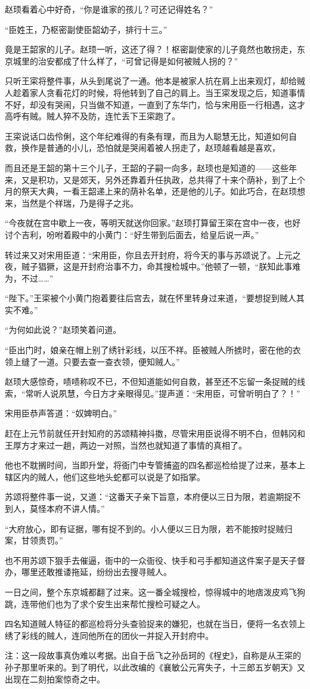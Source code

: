 赵顼看着心中好奇，“你是谁家的孩儿？可还记得姓名？”

“臣姓王，乃枢密副使臣韶幼子，排行十三。”

竟是王韶家的儿子。赵顼一听，这还了得？！枢密副使家的儿子竟然也敢拐走，东京城里的治安都成了什么样了，“可曾记得是如何被贼人拐的？”

只听王寀将整件事，从头到尾说了一通。他本是被家人抗在肩上出来观灯，却给贼人趁着家人贪看花灯的时候，将他转到了自己的肩上。当王寀发现之后，知道事情不好，却没有哭闹，只当做不知道，一直到了东华门，恰与宋用臣一行相遇，这才高呼有贼。贼人猝不及防，连忙丢下王寀跑了。

王寀说话口齿伶俐，这个年纪难得的有条有理，而且为人聪慧无比，知道如何自救，换作是普通的小儿，恐怕就是哭闹着被人拐走了，赵顼越看越是喜欢，

而且还是王韶的第十三个儿子，王韶的子嗣一向多，赵顼也是知道的——这些年来，又是积功，又是郊天，另外还靠着升任执政，总共得了十来个荫补，到了上个月的祭天大典，一看王韶递上来的荫补名单，还是他的儿子。如此巧合，在赵顼想来，当然是个祥瑞，乃是得子之兆。

“今夜就在宫中歇上一夜，等明天就送你回家。”赵顼打算留王寀在宫中一夜，也好讨个吉利，吩咐着殿中的小黄门：“好生带到后面去，给皇后说一声。”

转过来又对宋用臣道：“宋用臣，你且去开封府，将今天的事与苏颂说了。上元之夜，贼子猖獗，这是开封府治事不力，命其搜检城中。”他顿了一顿，“朕知此事难为，不过……”

“陛下。”王寀被个小黄门抱着要往后宫去，就在怀里转身过来道，“要想捉到贼人其实不难。”

“为何如此说？”赵顼笑着问道。

“臣出门时，娘亲在帽上别了绣针彩线，以压不祥。臣被贼人所掳时，密在他的衣领上缝了一道。只要去查一查衣领，便知贼人。”

赵顼大感惊奇，啧啧称叹不已，不但知道能如何自救，甚至还不忘留一条捉贼的线索，“常听人说夙慧，今日方才亲眼得见。”提声道：“宋用臣，可曾听明白了？！”

宋用臣恭声答道：“奴婢明白。”

赶在上元节前就任开封知府的苏颂精神抖擞，尽管宋用臣说得不明不白，但韩冈和王厚方才来过一趟，两边一对照，当然也就知道了事情的真相了。

他也不耽搁时间，当即升堂，将衙门中专管捕盗的四名都巡检给提了过来，基本上辖区内的贼人，他们这些地头蛇都可以说是了如指掌。

苏颂将整件事一说，又道：“这番天子亲下旨意，本府便以三日为限，若逾期捉不到人，莫怪本府不讲人情。”

“大府放心，即有证据，哪有捉不到的。小人便以三日为限，若不能按时捉贼归案，甘领责罚。”

也不用苏颂下狠手去催逼，衙中的一众衙役、快手和弓手都知道这件案子是天子督办，哪里还敢推诿拖延，纷纷出去搜寻贼人。

一日之间，整个东京城都翻了过来。这一番全城搜检，惊得城中的地痞泼皮鸡飞狗跳，连带他们也为了求个安生出来帮忙搜检可疑之人。

四名知道贼人特征的都巡检将分头查验捉来的嫌犯，也就在当日，便将一名衣领上绣了彩线的贼人，连同他所在的团伙一并捉入开封府中。

注：这一段故事真伪难以考据。出自于岳飞之孙岳珂的《桯史》，自称是从王寀的孙子那里听来的。到了明代，以此改编的《襄敏公元宵失子，十三郎五岁朝天》又出现在二刻拍案惊奇之中。

